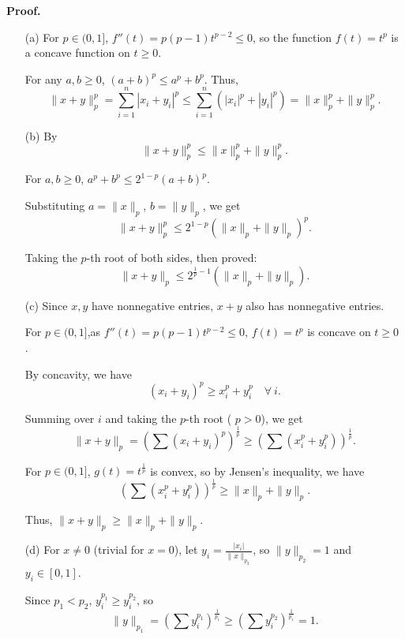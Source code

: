\documentclass[a4paper, 11pt]{article}
\newenvironment{solution}
    {\textbf{Proof.}}
    {}
\begin{document}
\begin{solution}
    \begin{enumerate}
	\item[(a)] For \(p \in (0, 1]\), \(f''(t) = p(p-1)t^{p-2} \leq 0\), so the function \( f(t) = t^p \) is a concave function on \( t \geq 0 \).
	
	For any \(a, b \geq 0\), \((a + b)^p \leq a^p + b^p\). Thus,
$$
	\|x + y\|_p^p = \sum_{i=1}^n |x_i + y_i|^p \leq \sum_{i=1}^n (|x_i|^p + |y_i|^p) = \|x\|_p^p + \|y\|_p^p.
$$
	
	\item[(b)] 
	By
	$$\|x + y\|_p^p \leq \|x\|_p^p + \|y\|_p^p.$$

	For \(a, b \geq 0\), \(a^p + b^p \leq 2^{1-p} (a + b)^p\). 
	
	Substituting \(a = \|x\|_p\), \(b = \|y\|_p\), we get
$$
	\|x + y\|_p^p \leq 2^{1-p} (\|x\|_p + \|y\|_p)^p.
$$
	
	Taking the \( p \)-th root of both sides, then proved:
	 $$ \|x + y\|_p \leq 2^{\frac{1}{p} - 1} (\|x\|_p + \|y\|_p) .$$
	 
	\item[(c)] 
	 Since \( x, y \) have nonnegative entries, \( x + y \) also has nonnegative entries. 
	 
	 For \( p \in (0,1] \),as \( f''(t) = p(p-1)t^{p-2} \leq 0 \), \( f(t) = t^p \) is concave on \( t \geq 0 \) . 
	 
	 By concavity, we have
	$$
	 (x_i + y_i)^p \geq x_i^p + y_i^p \quad \forall\ i.
	 $$
	 
	 Summing over \( i \) and taking the \( p \)-th root ( \( p > 0 \)), we get
	$$
	 \|x + y\|_p = \left( \sum (x_i + y_i)^p \right)^{\frac{1}{p}} \geq \left( \sum (x_i^p + y_i^p) \right)^{\frac{1}{p}}.
$$

	 For \( p \in (0,1] \), \( g(t) = t^{\frac{1}{p}} \) is convex, so by Jensen's inequality, we have
	$$
	 \left( \sum (x_i^p + y_i^p) \right)^{\frac{1}{p}} \geq \|x\|_p + \|y\|_p.
	 $$
	 
	 Thus, \( \|x + y\|_p \geq \|x\|_p + \|y\|_p \).
	 
		\item[(d)] 
	 For \( x \neq 0 \) (trivial for \( x = 0 \)), let \( y_i = \frac{|x_i|}{\|x\|_{p_2}} \), so \( \|y\|_{p_2} = 1 \) and \( y_i \in [0,1] \). 
	 
	 Since \( p_1 < p_2 \), \( y_i^{p_1} \geq y_i^{p_2} \), so
$$
	 \|y\|_{p_1} = \left( \sum y_i^{p_1} \right)^{\frac{1}{p_1}} \geq \left( \sum y_i^{p_2} \right)^{\frac{1}{p_1}} = 1.
$$


\end{enumerate}
\end{solution}
\end{document}
